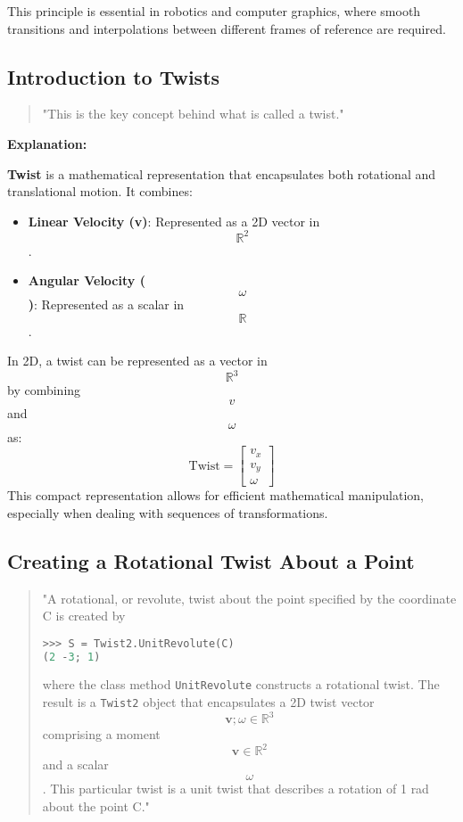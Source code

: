 \documentclass[12pt]{article}
\begin{document}
This principle is essential in robotics and computer graphics, where smooth transitions and interpolations between different frames of reference are required.

\subsection{Introduction to Twists}

\begin{quote}
"This is the key concept behind what is called a twist."
\end{quote}

\textbf{Explanation:}

\textbf{Twist} is a mathematical representation that encapsulates both rotational and translational motion. It combines:
\begin{itemize}
    \item \textbf{Linear Velocity (v)}: Represented as a 2D vector in $$\mathbb{R}^2$$.
    \item \textbf{Angular Velocity ($$\omega$$)}: Represented as a scalar in $$\mathbb{R}$$.
\end{itemize}

In 2D, a twist can be represented as a vector in $$\mathbb{R}^3$$ by combining $$ v $$ and $$ \omega $$ as:
$$
\text{Twist} = 
\begin{bmatrix}
v_x \\
v_y \\
\omega 
\end{bmatrix}
$$
This compact representation allows for efficient mathematical manipulation, especially when dealing with sequences of transformations.

\subsection{Creating a Rotational Twist About a Point}

\begin{quote}
"A rotational, or revolute, twist about the point specified by the coordinate C is created by
\begin{lstlisting}[language=Python]
>>> S = Twist2.UnitRevolute(C)
(2 -3; 1)
\end{lstlisting}
where the class method \texttt{UnitRevolute} constructs a rotational twist. The result is a \texttt{Twist2} object that encapsulates a 2D twist vector $$\mathbf{v}; \omega \in \mathbb{R}^3$$ comprising a moment $$\mathbf{v} \in \mathbb{R}^2$$ and a scalar $$\omega$$. This particular twist is a unit twist that describes a rotation of 1 rad about the point C."
\end{quote}
\end{document}
